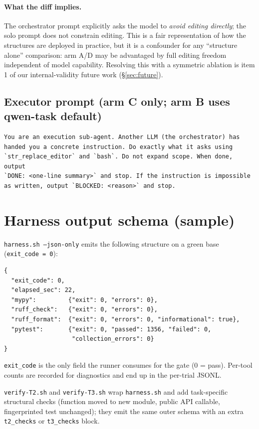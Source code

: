 \documentclass[11pt,a4paper]{article}
\begin{document}
\paragraph{What the diff implies.}
The orchestrator prompt explicitly asks the model to \emph{avoid editing directly}; the solo prompt does not constrain editing. This is a fair representation of how the structures are deployed in practice, but it is a confounder for any ``structure alone'' comparison: arm A/D may be advantaged by full editing freedom independent of model capability. Resolving this with a symmetric ablation is item 1 of our internal-validity future work (\S\ref{sec:future}).

\subsection{Executor prompt (arm C only; arm B uses qwen-task default)}

\begin{verbatim}
You are an execution sub-agent. Another LLM (the orchestrator) has
handed you a concrete instruction. Do exactly what it asks using
`str_replace_editor` and `bash`. Do not expand scope. When done, output
`DONE: <one-line summary>` and stop. If the instruction is impossible
as written, output `BLOCKED: <reason>` and stop.
\end{verbatim}

\section{Harness output schema (sample)}
\label{app:harness}

\texttt{harness.sh --json-only} emits the following structure on a green base (\texttt{exit\_code = 0}):

\begin{verbatim}
{
  "exit_code": 0,
  "elapsed_sec": 22,
  "mypy":         {"exit": 0, "errors": 0},
  "ruff_check":   {"exit": 0, "errors": 0},
  "ruff_format":  {"exit": 0, "errors": 0, "informational": true},
  "pytest":       {"exit": 0, "passed": 1356, "failed": 0,
                   "collection_errors": 0}
}
\end{verbatim}

\texttt{exit\_code} is the only field the runner consumes for the gate (0 = pass). Per-tool counts are recorded for diagnostics and end up in the per-trial JSONL.

\texttt{verify-T2.sh} and \texttt{verify-T3.sh} wrap \texttt{harness.sh} and add task-specific structural checks (function moved to new module, public API callable, fingerprinted test unchanged); they emit the same outer schema with an extra \texttt{t2\_checks} or \texttt{t3\_checks} block.
\end{document}
